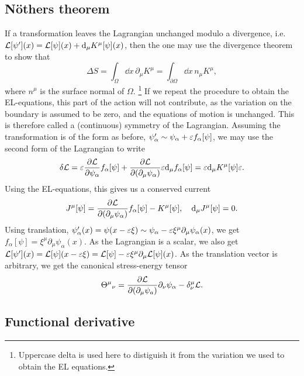 \subsection*{Nöthers theorem}
If a transformation leaves the Lagrangian unchanged modulo a divergence, i.e. $\mathcal L[\psi'](x) = \mathcal L[\psi](x) + \mathrm{d}_\mu K^\mu[\psi](x)$, then the one may use the divergence theorem to show that
\begin{equation*}
    \Delta S = \int_\Omega \dd x \, \partial_\mu K^\mu = \int_{\partial \Omega} \dd x \,n_\mu K^\mu,
\end{equation*}
where $n^\mu$ is the surface normal of $\Omega$. \footnote{Uppercase delta is used here to distiguish it from the variation we used to obtain the EL equations.} 
If we repeat the procedure to obtain the EL-equations, this part of the action will not contribute, as the variation on the boundary is assumed to be zero,
and the equations of motion is unchanged.
This is therefore called a (continuous) symmetry of the Lagrangian.
Assuming the transformation is of the form as before, $\psi'_\alpha \sim \psi_\alpha + \varepsilon f_\alpha[\psi]$, we may use the second form of the Lagrangian to write
\begin{equation*}
    \delta \Ell = \eps \pdv{\Ell}{\psi_\alpha} f_\alpha[\psi] + \pdv{\Ell}{(\partial_\mu \psi_\alpha)} \eps \dd_\mu f_\alpha[\psi] = \eps \dd_\mu K^\mu[\psi] \eps.
\end{equation*}
Using the EL-equations, this gives us a conserved current
\begin{equation*}
    J^\mu[\psi] = \pdv{\Ell}{(\partial_\mu \psi_\alpha)} f_\alpha[\psi] - K^\mu[\psi], \quad \dd_\mu J^\mu[\psi] = 0. 
\end{equation*}
Using translation, $\psi_\alpha'(x) = \psi(x - \varepsilon \xi) \sim \psi_\alpha - \varepsilon \xi^\mu\partial_\mu \psi_\alpha(x)$, we get $f_\alpha[\psi] = \xi^\mu\partial_\mu \psi_\alpha(x)$.
As the Lagrangian is a scalar, we also get $\mathcal L[\psi'](x) = \mathcal L[\psi](x - \varepsilon \xi) = \mathcal L[\psi] - \varepsilon \xi^\mu \partial_\mu \mathcal L[\psi](x)$.
As the translation vector is arbitrary, we get the canonical stress-energy tensor
\begin{equation*}
    \Theta^\mu{}_\nu = \pdv{\Ell}{(\partial_\mu \psi_a)} \partial_\nu \psi_\alpha - \delta^\mu_\nu \Ell.
\end{equation*}



\subsection*{Functional derivative}


